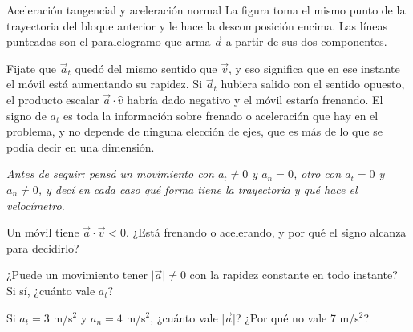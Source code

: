 \documentclass[11pt,openany]{book}
\begin{document}
\begin{bloque}{Aceleración tangencial y aceleración normal}
La figura toma el mismo punto de la trayectoria del bloque anterior y le hace la descomposición encima. Las líneas punteadas son el paralelogramo que arma $\vec a$ a partir de sus dos componentes.

\begin{center}
\end{center}

Fijate que $\vec a_t$ quedó del mismo sentido que $\vec v$, y eso significa que en ese instante el móvil está aumentando su rapidez. Si $\vec a_t$ hubiera salido con el sentido opuesto, el producto escalar $\vec a\cdot\hat v$ habría dado negativo y el móvil estaría frenando. El signo de $a_t$ es toda la información sobre frenado o aceleración que hay en el problema, y no depende de ninguna elección de ejes, que es más de lo que se podía decir en una dimensión.

\textit{Antes de seguir: pensá un movimiento con $a_t \neq 0$ y $a_n = 0$, otro con $a_t = 0$ y $a_n \neq 0$, y decí en cada caso qué forma tiene la trayectoria y qué hace el velocímetro.}
\end{bloque}

\begin{chequeo}
\item Un móvil tiene $\vec a\cdot\vec v < 0$. ¿Está frenando o acelerando, y por qué el signo alcanza para decidirlo?
\item ¿Puede un movimiento tener $\lvert\vec a\rvert \neq 0$ con la rapidez constante en todo instante? Si sí, ¿cuánto vale $a_t$?
\item Si $a_t = 3$ m/s$^2$ y $a_n = 4$ m/s$^2$, ¿cuánto vale $\lvert\vec a\rvert$? ¿Por qué no vale 7 m/s$^2$?
\end{chequeo}
\end{document}
